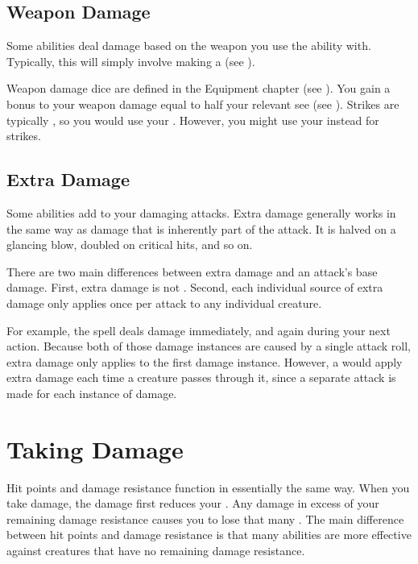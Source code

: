   \subsection{Weapon Damage}\label{Weapon Damage}
    Some abilities deal damage based on the weapon you use the ability with.
    Typically, this will simply involve making a  (see ).

    Weapon damage dice are defined in the Equipment chapter (see ).
    You gain a bonus to your weapon damage equal to half your relevant  see (see ).
    Strikes are typically , so you would use your .
    However, you might use your  instead for \magical strikes.

  \subsection{Extra Damage}\label{Extra Damage}
    Some abilities add  to your damaging attacks.
    Extra damage generally works in the same way as damage that is inherently part of the attack.
    It is halved on a glancing blow, doubled on critical hits, and so on.

    There are two main differences between extra damage and an attack's base damage.
    First, extra damage is not .
    Second, each individual source of extra damage only applies once per attack to any individual creature.

    For example, the  spell deals damage immediately, and again during your next action.
    Because both of those damage instances are caused by a single attack roll, extra damage only applies to the first damage instance.
    However, a  would apply extra damage each time a creature passes through it, since a separate attack is made for each instance of damage.

\section{Taking Damage}\label{Taking Damage}
  Hit points and damage resistance function in essentially the same way.
  When you take damage, the damage first reduces your .
  Any damage in excess of your remaining damage resistance causes you to lose that many .
  The main difference between hit points and damage resistance is that many abilities are more effective against creatures that have no remaining damage resistance.


